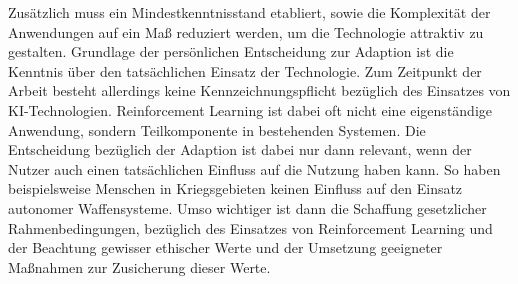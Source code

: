 Zusätzlich muss ein Mindestkenntnisstand etabliert, sowie die Komplexität der Anwendungen auf ein Maß reduziert werden, um die Technologie attraktiv zu gestalten.
\ab 
Grundlage der persönlichen Entscheidung zur Adaption ist die Kenntnis über den tatsächlichen Einsatz der Technologie. 
Zum Zeitpunkt der Arbeit besteht allerdings keine Kennzeichnungspflicht bezüglich des Einsatzes von KI-Technologien.
Reinforcement Learning ist dabei oft nicht eine eigenständige Anwendung, sondern Teilkomponente in bestehenden Systemen.
Die Entscheidung bezüglich der Adaption ist dabei nur dann relevant, wenn der Nutzer auch einen tatsächlichen Einfluss auf die Nutzung haben kann.
So haben beispielsweise Menschen in Kriegsgebieten keinen Einfluss auf den Einsatz autonomer Waffensysteme.
Umso wichtiger ist dann die Schaffung gesetzlicher Rahmenbedingungen, bezüglich des Einsatzes von Reinforcement Learning und der Beachtung gewisser ethischer Werte und der Umsetzung geeigneter Maßnahmen zur Zusicherung dieser Werte.